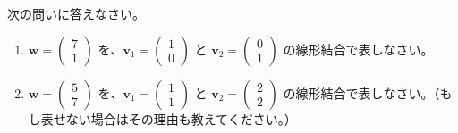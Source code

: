 \begin{quiz}
次の問いに答えなさい。
\begin{enumerate}
\item $\bm{w} = \begin{pmatrix} 7 \\ 1 \end{pmatrix}$ を、$\bm{v}_1 = \begin{pmatrix} 1 \\ 0 \end{pmatrix}$ と $\bm{v}_2 = \begin{pmatrix} 0 \\ 1 \end{pmatrix}$ の線形結合で表しなさい。
\item $\bm{w} = \begin{pmatrix} 5 \\ 7 \end{pmatrix}$ を、$\bm{v}_1 = \begin{pmatrix} 1 \\ 1 \end{pmatrix}$ と $\bm{v}_2 = \begin{pmatrix} 2 \\ 2 \end{pmatrix}$ の線形結合で表しなさい。（もし表せない場合はその理由も教えてください。）
\end{enumerate}
\end{quiz}

